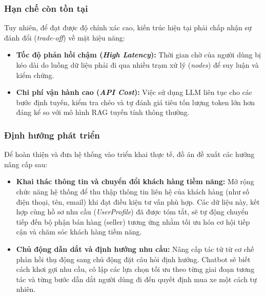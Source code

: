 \subsubsection{Hạn chế còn tồn tại}

Tuy nhiên, để đạt được độ chính xác cao, kiến trúc hiện tại phải chấp nhận sự đánh đổi (\textit{trade-off}) về mặt hiệu năng:
\begin{itemize}
    \item \textbf{Tốc độ phản hồi chậm (\textit{High Latency}):} Thời gian chờ của người dùng bị kéo dài do luồng dữ liệu phải đi qua nhiều trạm xử lý (\textit{nodes}) để suy luận và kiểm chứng.
    \item \textbf{Chi phí vận hành cao (\textit{API Cost}):} Việc sử dụng LLM liên tục cho các bước định tuyến, kiểm tra chéo và tự đánh giá tiêu tốn lượng token lớn hơn đáng kể so với mô hình RAG tuyến tính thông thường.
\end{itemize}

\subsubsection{Định hướng phát triển}

Để hoàn thiện và đưa hệ thống vào triển khai thực tế, đồ án đề xuất các hướng nâng cấp sau:

\begin{itemize}
    \item \textbf{Khai thác thông tin và chuyển đổi khách hàng tiềm năng:} Mở rộng chức năng hệ thống để thu thập thông tin liên hệ của khách hàng (như số điện thoại, tên, email) khi đạt điều kiện tư vấn phù hợp. Các dữ liệu này, kết hợp cùng hồ sơ nhu cầu (\textit{UserProfile}) đã được tóm tắt, sẽ tự động chuyển tiếp đến bộ phận bán hàng (seller) tương ứng nhằm tối ưu hóa cơ hội tiếp cận và chăm sóc khách hàng tiềm năng.
    
    \item \textbf{Chủ động dẫn dắt và định hướng nhu cầu:} Nâng cấp tác tử từ cơ chế phản hồi thụ động sang chủ động đặt câu hỏi định hướng. Chatbot sẽ biết cách khơi gợi nhu cầu, cô lập các lựa chọn tối ưu theo từng giai đoạn tương tác và từng bước dẫn dắt người dùng đi đến quyết định mua xe một cách tự nhiên.
\end{itemize}

